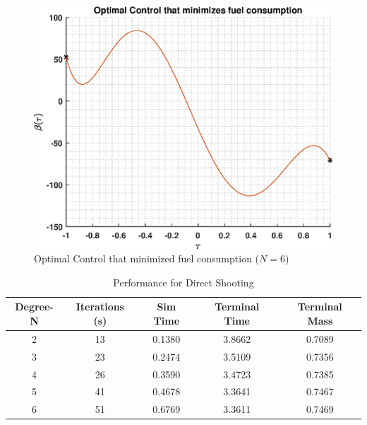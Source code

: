 \documentclass[]{article}
\begin{document}
\begin{figure}
	\centering
	\includegraphics[scale=0.75]{directControlPoly6.eps}
	\caption{Optimal Control that minimized fuel consumption (\(N = 6\))}
	\label{fig:directControlPoly6}
\end{figure}
\begin{table}
	\centering
	\begin{tabular}{||c c c c c||} 
		\hline
		Degree-N & Iterations (s) & Sim Time & Terminal Time & Terminal Mass\\ [0.5ex] 
		\hline\hline
		2           & 13            & 0.1380     &  3.8662     & 0.7089\\
		\hline
		3           & 23            & 0.2474     &  3.5109     & 0.7356\\ 
		\hline
		4           & 26            & 0.3590     &  3.4723     & 0.7385\\ 
		\hline
		5           & 41            & 0.4678     &  3.3641     & 0.7467\\ 
		\hline
		6           & 51            & 0.6769     &  3.3611     & 0.7469\\ [1ex]
		\hline
	\end{tabular}
	\caption{Performance for Direct Shooting}
	\label{table:3}
\end{table}
\end{document}
